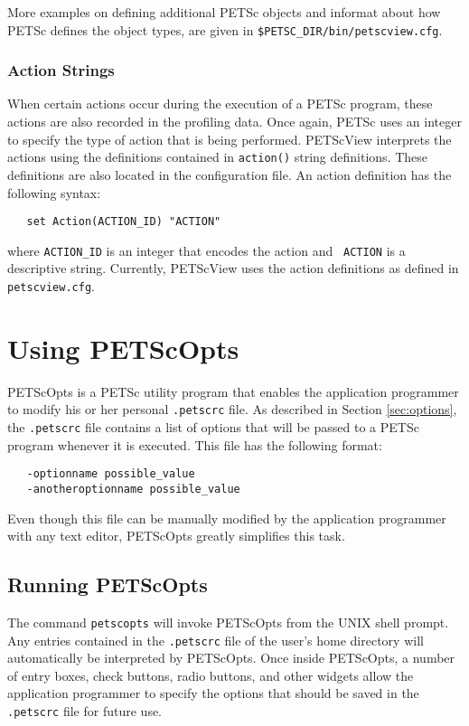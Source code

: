 More examples on defining additional PETSc objects and informat
about how PETSc defines the object types, are given in 
{\tt \$PETSC\_DIR/bin/petscview.cfg}.

\subsubsection{Action Strings}

When certain actions occur during the execution of a PETSc program,
these actions are also recorded in the profiling data.  Once again,
PETSc uses an integer to specify the type of action that is being
performed.  PETScView interprets the actions using the
definitions contained in {\tt action()} string definitions.  These
definitions are also located in the configuration file.  An action
definition has the following syntax:
\begin{verbatim}
   set Action(ACTION_ID) "ACTION"
\end{verbatim}
where {\tt ACTION\_ID} is an integer that encodes the action and {\tt
ACTION} is a descriptive string.  Currently, PETScView uses the action
definitions as defined in {\tt petscview.cfg}.

\section{Using PETScOpts}
\label{sec:petscopts}

PETScOpts is a PETSc utility program that enables the application
programmer to modify his or her personal {\tt .petscrc} file.  As
described in Section \ref{sec:options}, the {\tt .petscrc} file
contains a list of options that will be passed to a PETSc program
whenever it is executed.  This file has the following format:
\begin{verbatim}
   -optionname possible_value
   -anotheroptionname possible_value
\end{verbatim}
Even though this file can be manually modified by the application
programmer with any text editor, PETScOpts greatly simplifies this
task.

\subsection{Running PETScOpts}

The command {\tt petscopts} will invoke PETScOpts from the UNIX
shell prompt.  Any entries contained in the {\tt .petscrc} file of the
user's home directory will automatically be interpreted by PETScOpts.
Once inside PETScOpts, a number of entry boxes, check
buttons, radio buttons, and other widgets allow the application
programmer to specify the options that should be saved in the {\tt
.petscrc} file for future use.

